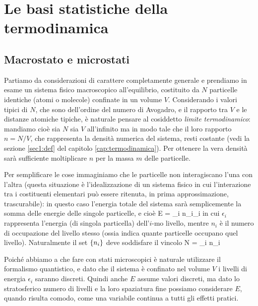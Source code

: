 \chapter{Le basi statistiche della termodinamica}
\label{cap:basi}

%
\section{Macrostato e microstati}
\label{sec:02-microstati}

Partiamo da considerazioni di carattere completamente generale e prendiamo in esame un sistema fisico macroscopico all'equilibrio, costituito da $N$ particelle identiche (atomi o molecole) confinate in un volume $V$. Considerando i valori tipici di $N$, che sono dell'ordine del numero di Avogadro, e il rapporto tra $V$ e le distanze atomiche tipiche, è naturale pensare al cosiddetto {\em limite termodinamico}: mandiamo cioè sia $N$ sia $V$ all'infinito ma in modo tale che il loro rapporto $n = N/V$, che rappresenta la densità numerica del sistema, resti costante (vedi la sezione \ref{sec1:def} del capitolo \ref{cap:termodinamica}). Per ottenere la vera densità sarà sufficiente moltiplicare $n$ per la massa $m$ delle particelle.

Per semplificare le cose immaginiamo che le particelle non interagiscano l'una con l'altra (questa situazione è l'idealizzazione di un sistema fisico in cui l'interazione tra i costituenti elementari può essere ritenuta, in prima approssimazione, trascurabile): in questo caso l'energia totale del sistema sarà semplicemente la somma delle energie delle singole particelle, e cioè
\be
\label{eq:etot}
E = \sum_{i} n_{i}\epsilon_{i}
\ee
in cui $\epsilon_{i}$ rappresenta l'energia (di singola particella) dell'$i$-mo livello, mentre $n_{i}$ è il numero di occupazione del livello stesso (ossia indica quante particelle occupano quel livello). Naturalmente il set $\{n_{i}\}$ deve soddisfare il vincolo
\be
\label{eq:ntot}
N = \sum_{i} n_{i}
\ee

Poiché abbiamo a che fare con stati microscopici è naturale utilizzare il formalismo quantistico, e dato che il sistema è confinato nel volume $V$ i livelli di energia $\epsilon_{i}$ saranno discreti. Quindi anche $E$ assume valori discreti, ma dato lo stratosferico numero di livelli e la loro spaziatura fine possiamo considerare $E$, quando risulta comodo, come una variabile continua a tutti gli effetti pratici.

